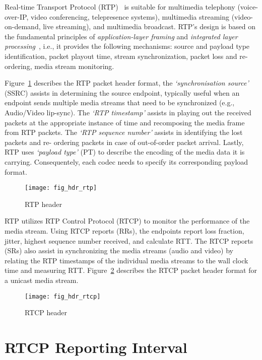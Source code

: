 
Real-time Transport Protocol (RTP)~\cite{rfc3550} is suitable for multimedia
telephony (voice-over-IP, video conferencing, telepresence systems),
multimedia streaming (video-on-demand, live streaming), and multimedia
broadcast. RTP's design is based on the fundamental principles of \textit
{application-layer framing} and \textit{integrated layer
processing}~\cite{clark:alf}, i.e., it provides the following mechanisms:
source and payload type identification, packet playout time, stream
synchronization, packet loss and re-ordering, media stream monitoring.

Figure~\ref{fig:3:rtp.hdr} describes the RTP packet header format, the
\textit{`synchronisation source'} (SSRC) assists in determining the source
endpoint, typically useful when an endpoint sends multiple media streams that
need to be synchronized (e.g., Audio/Video lip-sync). The \textit{`RTP
timestamp'} assists in playing out the received packets at the appropriate
instance of time and recomposing the media frame from RTP packets. The
\textit{`RTP sequence number'} assists in identifying the lost packets and re-
ordering packets in case of out-of-order packet arrival. Lastly, RTP uses
\textit{`payload type'} (PT) to describe the encoding of the media data it is
carrying. Consequentely, each codec needs to specify its corresponding payload
format.

\begin{figure}[!htbp]
\centerline{\texttt{[image: fig\_hdr\_rtp]}}
\caption{RTP header}
\label{fig:3:rtp.hdr}
\end{figure}

RTP utilizes RTP Control Protocol (RTCP) to monitor the performance of the
media stream. Using RTCP reports (RRs), the endpoints report loss fraction,
jitter, highest sequence number received, and calculate RTT. The RTCP reports
(SRs) also assist in synchronizing the media streams (audio and video) by
relating the RTP timestamps of the individual media streams to the wall clock
time and measuring RTT. Figure~\ref{fig:3:rtcp.hdr} describes the RTCP packet
header format for a unicast media stream.

\begin{figure}
\centerline{\texttt{[image: fig\_hdr\_rtcp]}}
\caption{RTCP header}
\label{fig:3:rtcp.hdr}
\end{figure}

\section{RTCP Reporting Interval}

